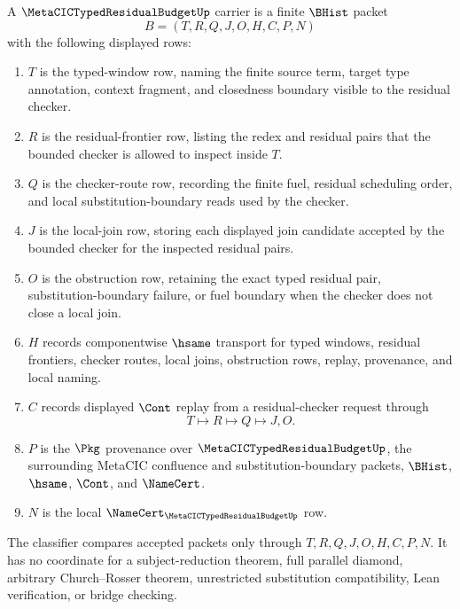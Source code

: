 \begin{definition}
\label{def:metacic-typed-residual-budget-carrier}
A $\MetaCICTypedResidualBudgetUp$ carrier is a finite $\BHist$ packet
$$
B=(T,R,Q,J,O,H,C,P,N)
$$
with the following displayed rows:
\begin{enumerate}
\item $T$ is the typed-window row, naming the finite source term, target type annotation, context fragment, and closedness boundary visible to the residual checker.
\item $R$ is the residual-frontier row, listing the redex and residual pairs that the bounded checker is allowed to inspect inside $T$.
\item $Q$ is the checker-route row, recording the finite fuel, residual scheduling order, and local substitution-boundary reads used by the checker.
\item $J$ is the local-join row, storing each displayed join candidate accepted by the bounded checker for the inspected residual pairs.
\item $O$ is the obstruction row, retaining the exact typed residual pair, substitution-boundary failure, or fuel boundary when the checker does not close a local join.
\item $H$ records componentwise $\hsame$ transport for typed windows, residual frontiers, checker routes, local joins, obstruction rows, replay, provenance, and local naming.
\item $C$ records displayed $\Cont$ replay from a residual-checker request through
$$
T \longmapsto R \longmapsto Q \longmapsto J,O .
$$
\item $P$ is the $\Pkg$ provenance over $\MetaCICTypedResidualBudgetUp$, the surrounding MetaCIC confluence and substitution-boundary packets, $\BHist$, $\hsame$, $\Cont$, and $\NameCert$.
\item $N$ is the local $\NameCert_{\MetaCICTypedResidualBudgetUp}$ row.
\end{enumerate}
The classifier compares accepted packets only through $T,R,Q,J,O,H,C,P,N$. It has no coordinate for a subject-reduction theorem, full parallel diamond, arbitrary Church--Rosser theorem, unrestricted substitution compatibility, Lean verification, or bridge checking.
\end{definition}

